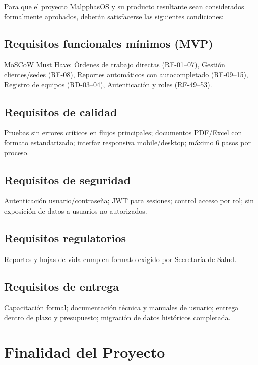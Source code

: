 \documentclass[12pt,a4paper]{article}
\begin{document}
Para que el proyecto MalpphasOS y su producto resultante sean considerados formalmente
aprobados, deberán satisfacerse las siguientes condiciones:

\subsection{Requisitos funcionales mínimos (MVP)}

MoSCoW Must Have: Órdenes de trabajo directas (RF-01--07), Gestión clientes/sedes (RF-08), Reportes automáticos con autocompletado (RF-09--15), Registro de equipos (RD-03--04), Autenticación y roles (RF-49--53).

\subsection{Requisitos de calidad}

Pruebas sin errores críticos en flujos principales; documentos PDF/Excel con formato estandarizado; interfaz responsiva mobile/desktop; máximo 6 pasos por proceso.

\subsection{Requisitos de seguridad}

Autenticación usuario/contraseña; JWT para sesiones; control acceso por rol; sin exposición de datos a usuarios no autorizados.

\subsection{Requisitos regulatorios}

Reportes y hojas de vida cumplen formato exigido por Secretaría de Salud.

\subsection{Requisitos de entrega}

Capacitación formal; documentación técnica y manuales de usuario; entrega dentro de plazo y presupuesto; migración de datos históricos completada.

\section{Finalidad del Proyecto}
\end{document}
